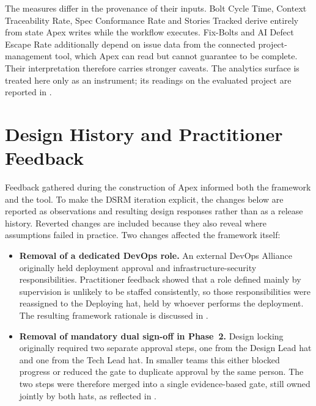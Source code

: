 The measures differ in the provenance of their inputs. Bolt Cycle Time, Context Traceability Rate, Spec Conformance Rate and Stories Tracked derive entirely from state Apex writes while the workflow executes. Fix-Bolts and AI Defect Escape Rate additionally depend on issue data from the connected project-management tool, which Apex can read but cannot guarantee to be complete. Their interpretation therefore carries stronger caveats. The analytics surface is treated here only as an instrument; its readings on the evaluated project are reported in .

\section{Design History and Practitioner Feedback}
\label{sec:apex_history}


Feedback gathered during the construction of Apex informed both the framework and the tool. To make the \ac{DSRM} iteration explicit, the changes below are reported as observations and resulting design responses rather than as a release history. Reverted changes are included because they also reveal where assumptions failed in practice. Two changes affected the framework itself:

\begin{itemize}[leftmargin=0.6cm, itemsep=0.4em]

\item \textbf{Removal of a dedicated DevOps role.} An external DevOps Alliance originally held deployment approval and infrastructure-security responsibilities. Practitioner feedback showed that a role defined mainly by supervision is unlikely to be staffed consistently, so those responsibilities were reassigned to the Deploying hat, held by whoever performs the deployment. The resulting framework rationale is discussed in .

\item \textbf{Removal of mandatory dual sign-off in Phase~2.} Design locking originally required two separate approval steps, one from the Design Lead hat and one from the Tech Lead hat. In smaller teams this either blocked progress or reduced the gate to duplicate approval by the same person. The two steps were therefore merged into a single evidence-based gate, still owned jointly by both hats, as reflected in .

\end{itemize}

